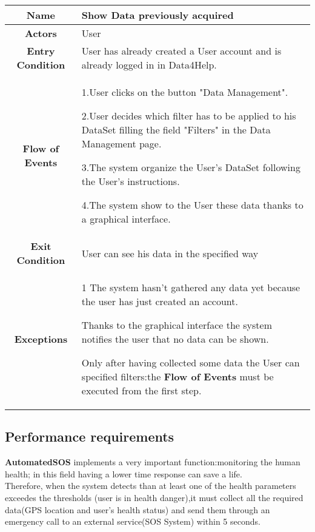  \begin{table}[h!]
   \centering
    \begin{tabularx}{\linewidth}{|c|X|}
         \hline
         \textbf{Name} & Show Data previously acquired\\
	\hline
	\textbf{Actors} & User\\
	\hline
	\textbf{Entry Condition} & User has already created a User account and is already logged in in Data4Help.\\
	\hline
	\textbf{Flow of Events} &
					1.User clicks on the button "Data Management".

					2.User decides which filter has to be applied to his DataSet filling the field "Filters" in the Data 						Management page.

					3.The system organize the User's DataSet following the User's instructions.

					4.The system show to the User these data thanks to a graphical interface. \\
	\hline
	\textbf{Exit Condition} & User can see his data in the specified way\\
	
	\hline
	\textbf{Exceptions} & 1 The system hasn't gathered any data yet because the user has just created an account. 

				Thanks to the graphical interface the system notifies the user that no data can be shown.

				Only after having collected some data the User can specified filters:the \textbf{Flow of Events} must be 				executed from the first step.\\

        \hline
      \end{tabularx}
      \end{table}

  \subsection{Performance requirements}
\textbf{AutomatedSOS} implements a very important function:monitoring the human health; in this field having a lower time response can save a life.\\ Therefore, when the system detects than at least one of the health parameters exceedes the thresholds (user is in health danger),it must collect all the required data(GPS location and user's health status) and send them through an emergency call to an external service(SOS System) within 5 seconds.
